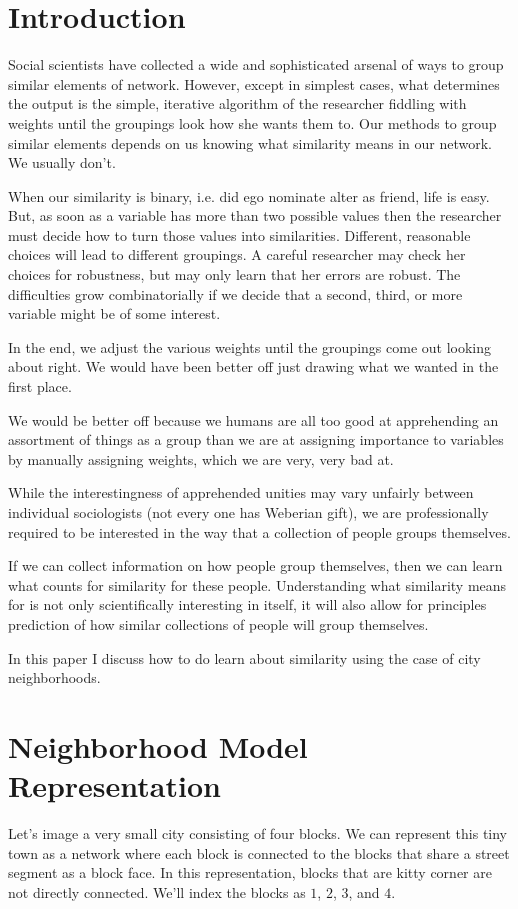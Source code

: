 \documentclass[12pt,draft,letter]{article}
\begin{document}
\section*{Introduction}
Social scientists have collected a wide and sophisticated arsenal of
ways to group similar elements of network. However, except in simplest
cases, what determines the output is the simple, iterative algorithm
of the researcher fiddling with weights until the groupings look how
she wants them to. Our methods to group similar elements depends on us
knowing what similarity means in our network. We usually don't.

When our similarity is binary, i.e. did ego nominate
alter as friend, life is easy. But, as soon as a variable has more
than two possible values then the researcher must decide how to turn
those values into similarities. Different, reasonable choices will
lead to different groupings. A careful researcher may check
her choices for robustness, but may only learn that her errors are
robust. The difficulties grow combinatorially if we decide that
a second, third, or more variable might be of some interest.

In the end, we adjust the various weights until the groupings come out
looking about right. We would have been better off just drawing what
we wanted in the first place.

We would be better off because we humans are all too good at
apprehending an assortment of things as a group than we are at
assigning importance to variables by manually assigning weights, which
we are very, very bad at.

While the interestingness of apprehended unities may vary 
unfairly between individual sociologists (not every one has Weberian gift),
we are professionally required to be interested in the way that a
collection of people groups themselves.

If we can collect information on how people group themselves, then we
can learn what counts for similarity for these people. Understanding
what similarity means for is not only scientifically interesting in
itself, it will also allow for principles prediction of how similar
collections of people will group themselves.

In this paper I discuss how to do learn about similarity using the
case of city neighborhoods. 

\section*{Neighborhood Model Representation}
Let's image a very small city consisting of four blocks. We can
represent this tiny town as a network where each block is connected
to the blocks that share a street segment as a block face. In this
representation, blocks that are kitty corner are not directly
connected. We'll index the blocks as $1$, $2$, $3$, and $4$.
\end{document}
